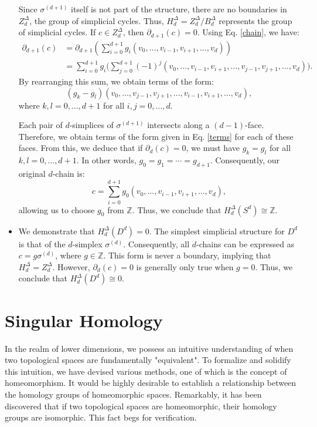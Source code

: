\begin{example}
\begin{itemize}
        Since $\sigma^{(d+1)}$ itself is not part of the structure, there are no boundaries in $Z^\Delta_d$, the group of simplicial cycles. Thus, $H^\Delta_d = Z^\Delta_d / B^\Delta_d$ represents the group of simplicial cycles. If $c \in Z^\Delta_d$, then $\partial_{d+1}(c) = 0$. Using Eq. \ref{chain}, we have:
        \begin{align*}
            \partial_{d+1}(c) &= \partial_{d+1}\left( \sum_{i=0}^{d+1} g_i (v_0, \ldots, v_{i-1}, v_{i+1}, \ldots, v_d) \right) \\
            &= \sum_{i=0}^{d+1} g_i \big( \sum_{j=0}^{d+1} (-1)^j (v_0, \ldots, v_{i-1}, v_{i+1}, \ldots, v_{j-1}, v_{j+1}, \ldots, v_d) \big).
        \end{align*}
        By rearranging this sum, we obtain terms of the form:
        \[
            \label{terms}
            (g_k - g_l)(v_0, \ldots, v_{j-1}, v_{j+1}, \ldots, v_{i-1}, v_{i+1}, \ldots, v_d),
        \]
        where $k, l = 0, \ldots, d+1$ for all $i, j = 0, \ldots, d$.

        Each pair of $d$-simplices of $\sigma^{(d+1)}$ intersects along a $(d-1)$-face. Therefore, we obtain terms of the form given in Eq. \ref{terms} for each of these faces. From this, we deduce that if $\partial_{d}(c) = 0$, we must have $g_k = g_l$ for all $k, l = 0, \ldots, d+1$. In other words, $g_0 = g_1 = \cdots = g_{d+1}$. Consequently, our original $d$-chain is:
        \[
            c = \sum_{i=0}^{d+1} g_0 (v_0, \ldots, v_{i-1}, v_{i+1}, \ldots, v_d),
        \]
        allowing us to choose $g_0$ from $\mathbb{Z}$. Thus, we conclude that $H^\Delta_d(S^d) \cong \mathbb{Z}$.

        \item We demonstrate that $H^\Delta_d(D^d) = 0$. The simplest simplicial structure for $D^d$ is that of the $d$-simplex $\sigma^{(d)}$. Consequently, all $d$-chains can be expressed as $c = g \sigma^{(d)}$, where $g \in \mathbb{Z}$. This form is never a boundary, implying that $H^\Delta_d = Z^\Delta_d$. However, $\partial_d(c) = 0$ is generally only true when $g = 0$. Thus, we conclude that $H^\Delta_d(D^d) \cong 0$.
    \end{itemize}
\end{example}




\section{Singular Homology}
\label{Singular Homology}
In the realm of lower dimensions, we possess an intuitive understanding of when two topological spaces are fundamentally "equivalent". To formalize and solidify this intuition, we have devised various methods, one of which is the concept of homeomorphism. It would be highly desirable to establish a relationship between the homology groups of homeomorphic spaces. Remarkably, it has been discovered that if two topological spaces are homeomorphic, their homology groups are isomorphic. This fact begs for verification.

